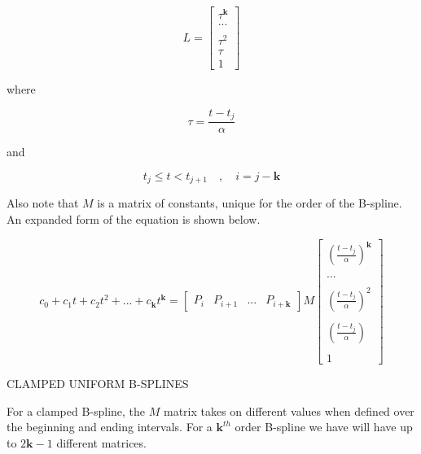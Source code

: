 \documentclass{article}
\begin{document}
    \begin{equation}
        L = \begin{bmatrix} \tau^{\textbf{k}} \\ ... \\ \\ \tau^2 \\ \tau \\ 1 \end{bmatrix}
    \end{equation}
    
    where
    
    \begin{equation}
        \tau = \frac{t-t_j}{\alpha}
    \end{equation}
    
    and
    
    \begin{equation}
        t_j \leq t < t_{j+1} \quad , \quad i = j-\textbf{k}
    \end{equation}
    
Also note that \(M\) is a matrix of constants, unique for the order of the B-spline. An expanded form of the equation is shown below.

\begin{equation}
    c_0 + c_1 t + c_2 t^2 + ... + c_{\textbf{k}} t^{\textbf{k}} = \begin{bmatrix} P_{i} & P_{i+1} & ... & P_{i+\textbf{k}}\end{bmatrix} M \begin{bmatrix} (\frac{t-t_j}{\alpha})^\textbf{k} \\ \\ ... \\ \\ (\frac{t-t_j}{\alpha})^2 \\ \\ (\frac{t-t_j}{\alpha}) \\ \\ 1 \end{bmatrix}
\end{equation}

\noindent CLAMPED UNIFORM B-SPLINES
\hfill \break

For a clamped B-spline, the \(M\) matrix takes on different values when defined over the beginning and ending intervals. For a \(\textbf{k}^{th}\) order B-spline we have will have up to \(2\textbf{k}-1\) different matrices.
\end{document}
